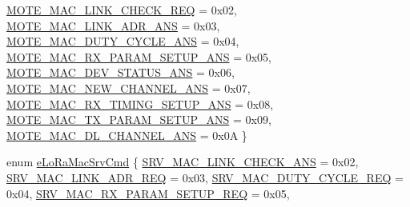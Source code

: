 \begin{DoxyCompactItemize}
\hyperlink{group__LORAMAC_ggaa56523d6cd76c438d6bc4263b5254d73a035270648ea6d6ff24b23a953d8f969b}{M\+O\+T\+E\+\_\+\+M\+A\+C\+\_\+\+L\+I\+N\+K\+\_\+\+C\+H\+E\+C\+K\+\_\+\+R\+EQ} = 0x02, 
\hyperlink{group__LORAMAC_ggaa56523d6cd76c438d6bc4263b5254d73a7e789c1aa1dfcd3ca03935dd65cf572c}{M\+O\+T\+E\+\_\+\+M\+A\+C\+\_\+\+L\+I\+N\+K\+\_\+\+A\+D\+R\+\_\+\+A\+NS} = 0x03, 
\hyperlink{group__LORAMAC_ggaa56523d6cd76c438d6bc4263b5254d73a258e400aeae362afff0d14b7f6153bd4}{M\+O\+T\+E\+\_\+\+M\+A\+C\+\_\+\+D\+U\+T\+Y\+\_\+\+C\+Y\+C\+L\+E\+\_\+\+A\+NS} = 0x04, 
\hyperlink{group__LORAMAC_ggaa56523d6cd76c438d6bc4263b5254d73a155ae506492f1ddb173b99b52da4092a}{M\+O\+T\+E\+\_\+\+M\+A\+C\+\_\+\+R\+X\+\_\+\+P\+A\+R\+A\+M\+\_\+\+S\+E\+T\+U\+P\+\_\+\+A\+NS} = 0x05, 
\newline
\hyperlink{group__LORAMAC_ggaa56523d6cd76c438d6bc4263b5254d73ae3d02a70f26e3f3daf8a84408e962425}{M\+O\+T\+E\+\_\+\+M\+A\+C\+\_\+\+D\+E\+V\+\_\+\+S\+T\+A\+T\+U\+S\+\_\+\+A\+NS} = 0x06, 
\hyperlink{group__LORAMAC_ggaa56523d6cd76c438d6bc4263b5254d73a83cdaea222c3968f69fe1c23c29a4385}{M\+O\+T\+E\+\_\+\+M\+A\+C\+\_\+\+N\+E\+W\+\_\+\+C\+H\+A\+N\+N\+E\+L\+\_\+\+A\+NS} = 0x07, 
\hyperlink{group__LORAMAC_ggaa56523d6cd76c438d6bc4263b5254d73abd4c19102721cfb18b76136732ac2de8}{M\+O\+T\+E\+\_\+\+M\+A\+C\+\_\+\+R\+X\+\_\+\+T\+I\+M\+I\+N\+G\+\_\+\+S\+E\+T\+U\+P\+\_\+\+A\+NS} = 0x08, 
\hyperlink{group__LORAMAC_ggaa56523d6cd76c438d6bc4263b5254d73a462cebd0ba7165044eeabf44c00b1f4c}{M\+O\+T\+E\+\_\+\+M\+A\+C\+\_\+\+T\+X\+\_\+\+P\+A\+R\+A\+M\+\_\+\+S\+E\+T\+U\+P\+\_\+\+A\+NS} = 0x09, 
\newline
\hyperlink{group__LORAMAC_ggaa56523d6cd76c438d6bc4263b5254d73a6dfc8ca9222ce73c834a0907992cce13}{M\+O\+T\+E\+\_\+\+M\+A\+C\+\_\+\+D\+L\+\_\+\+C\+H\+A\+N\+N\+E\+L\+\_\+\+A\+NS} = 0x0A
 \}
\item 
enum \hyperlink{group__LORAMAC_gac91cc4dc69ad7de2426360f9f1f2d079}{e\+Lo\+Ra\+Mac\+Srv\+Cmd} \{ \newline
\hyperlink{group__LORAMAC_ggac91cc4dc69ad7de2426360f9f1f2d079ac9df0550be22a470d4f68681ee97191c}{S\+R\+V\+\_\+\+M\+A\+C\+\_\+\+L\+I\+N\+K\+\_\+\+C\+H\+E\+C\+K\+\_\+\+A\+NS} = 0x02, 
\hyperlink{group__LORAMAC_ggac91cc4dc69ad7de2426360f9f1f2d079af7fc388963e2bb713062bd51960ed4cc}{S\+R\+V\+\_\+\+M\+A\+C\+\_\+\+L\+I\+N\+K\+\_\+\+A\+D\+R\+\_\+\+R\+EQ} = 0x03, 
\hyperlink{group__LORAMAC_ggac91cc4dc69ad7de2426360f9f1f2d079ae1175fb1d39611d84efb70f141064fbf}{S\+R\+V\+\_\+\+M\+A\+C\+\_\+\+D\+U\+T\+Y\+\_\+\+C\+Y\+C\+L\+E\+\_\+\+R\+EQ} = 0x04, 
\hyperlink{group__LORAMAC_ggac91cc4dc69ad7de2426360f9f1f2d079a534efe0aaa23bc72032a0e8b0335832b}{S\+R\+V\+\_\+\+M\+A\+C\+\_\+\+R\+X\+\_\+\+P\+A\+R\+A\+M\+\_\+\+S\+E\+T\+U\+P\+\_\+\+R\+EQ} = 0x05, 

\end{DoxyCompactItemize}
